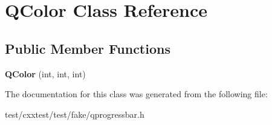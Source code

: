 \hypertarget{classQColor}{\section{Q\-Color Class Reference}
\label{classQColor}
}
\subsection*{Public Member Functions}
\begin{DoxyCompactItemize}
\item 
\hypertarget{classQColor_a074d13ddf024fcfe6416a5b4ea6a0094}{{\bfseries Q\-Color} (int, int, int)}\label{classQColor_a074d13ddf024fcfe6416a5b4ea6a0094}

\end{DoxyCompactItemize}


The documentation for this class was generated from the following file\-:\begin{DoxyCompactItemize}
\item 
test/cxxtest/test/fake/qprogressbar.\-h\end{DoxyCompactItemize}
